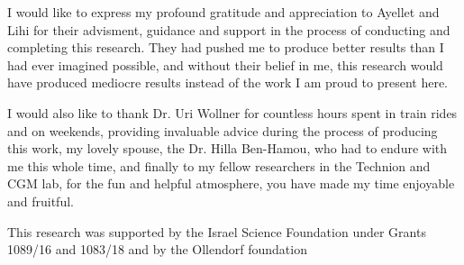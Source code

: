 I would like to express my profound gratitude and appreciation to Ayellet and Lihi for their advisment,
guidance and support in the process of conducting and completing this research. 
They had pushed me to produce better results than I had ever imagined possible, and without their belief in me, this research would have produced mediocre results instead of the work I am proud to present here.
 
I would also like to thank Dr. Uri Wollner for countless hours spent in train rides and on weekends, providing invaluable advice during the process of producing this work, my lovely spouse, the Dr. Hilla Ben-Hamou, who had to endure with me this whole time,  and finally to my fellow researchers in the Technion and CGM lab, for the fun and helpful atmosphere, you have made my time enjoyable and fruitful.

This research was supported by the Israel Science Foundation under Grants 1089/16 and 1083/18 and
by the Ollendorf foundation